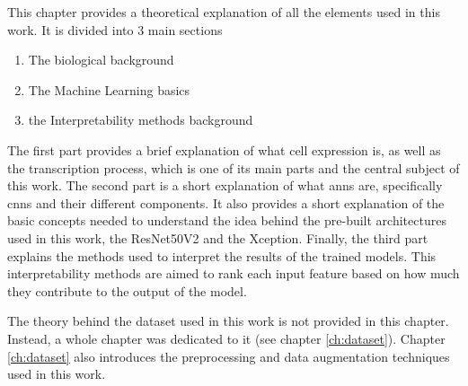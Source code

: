 
\glsresetall

This chapter provides a theoretical explanation of all the elements used in this work.
It is divided into 3 main sections
\begin{enumerate}
    \item The biological background
    \item The Machine Learning basics
    \item the Interpretability methods background
\end{enumerate}

The first part provides a brief explanation of what cell expression is, as well as the transcription process, which is one of its main parts and the central subject of this work.
The second part is a short explanation of what \glspl{ann} are, specifically \glspl{cnn} and their different components. It also provides a short explanation of the basic concepts needed to understand the idea behind the pre-built architectures used in this work, the ResNet50V2 and the Xception.
Finally, the third part explains the methods used to interpret the results of the trained models. This interpretability methods are aimed to rank each input feature based on how much they contribute to the output of the model.

The theory behind the dataset used in this work is not provided in this chapter. Instead, a whole chapter was dedicated to it (see chapter \ref{ch:dataset}). Chapter \ref{ch:dataset} also introduces the preprocessing and data augmentation techniques used in this work.
